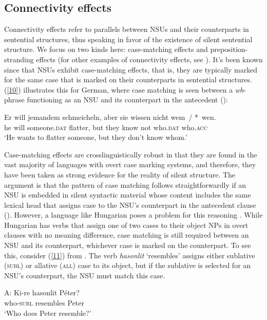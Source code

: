 {\subsection{Connectivity effects}
\label{sec-connectivity-effects}

Connectivity effects refer to parallels between NSUs and their counterparts in sentential structures, thus speaking in favor of the existence of silent sentential structure. We focus on two kinds here: case-matching effects and preposition-stranding effects (for other examples of connectivity effects, see \citealt{Ginzburg2018}). It's been known since \citet{Ross1967} that NSUs exhibit case-matching effects, that is, they are typically marked for the same case that is marked on their counterparts in sentential structures. (\ref{10}) illustrates this for German, where case matching is seen between a \emph{wh}-phrase functioning as an NSU and its counterpart in the antecedent (\citealt[663]{Merchant2005-proc}):

\ea
\gll Er will jemandem schmeicheln, aber sie wissen nicht wem~/ *~wen.\\
     he will someone.\textsc{dat} flatter, but they know not who.\textsc{dat}  who.\textsc{acc}\\
\glt `He wants to flatter someone, but they don't know whom.'\label{10}\z


Case-matching effects are crosslinguistically robust in that they are found in the vast majority of languages with overt case marking systems, and therefore, they have been taken as strong evidence for the reality of silent structure. The argument is that the pattern of case matching follows straightforwardly if an NSU is embedded in silent syntactic material whose content includes the same lexical head that assigns case to the NSU's counterpart in the antecedent clause (\citealt{Merchant2001, Merchant2005a}). However, a language like Hungarian poses a problem for this reasoning \citep{Jacobson2016}. While Hungarian has verbs that assign one of two cases to their object NPs in overt clauses with no meaning difference, case matching is still required between an NSU and its counterpart, whichever case is marked on the counterpart. To see this, consider (\ref{11}) from \citet[356]{Jacobson2016}. The verb \emph{hasonlit} `resembles' assigns either sublative (\textsc{subl}) or allative (\textsc{all}) case to its object, but if  the sublative is selected for an NSU's counterpart, the NSU  must match this case.

\ea
A: \gll Ki-re hasonlit P\'{e}ter?\\
        who-\textsc{subl} resembles Peter\\
   \glt  `Who does Peter resemble?'\\

}
